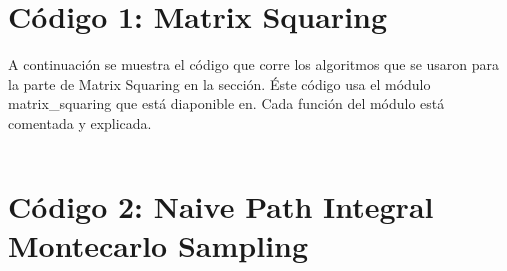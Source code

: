 \documentclass[%
 reprint,
 amsmath,amssymb,
 aps,
 pra,
]{revtex4-2}
\begin{document}
\newpage



\appendix

\begin{widetext}

\section{Código 1: Matrix Squaring\label{appx:codigo_matrix_squaring}}

A continuación se muestra el código que corre los algoritmos que se usaron para la parte de Matrix Squaring en la sección. Éste código usa el módulo matrix\_squaring que está diaponible en. Cada función del módulo está comentada y explicada.

\inputminted[linenos,breaklines]{python}{code_1.py}

\section{Código 2: Naive Path Integral Montecarlo Sampling\label{appx:codigo_temperatura_finita}}


\inputminted[linenos,breaklines]{python}{code_2.py}

\end{widetext}
\end{document}
